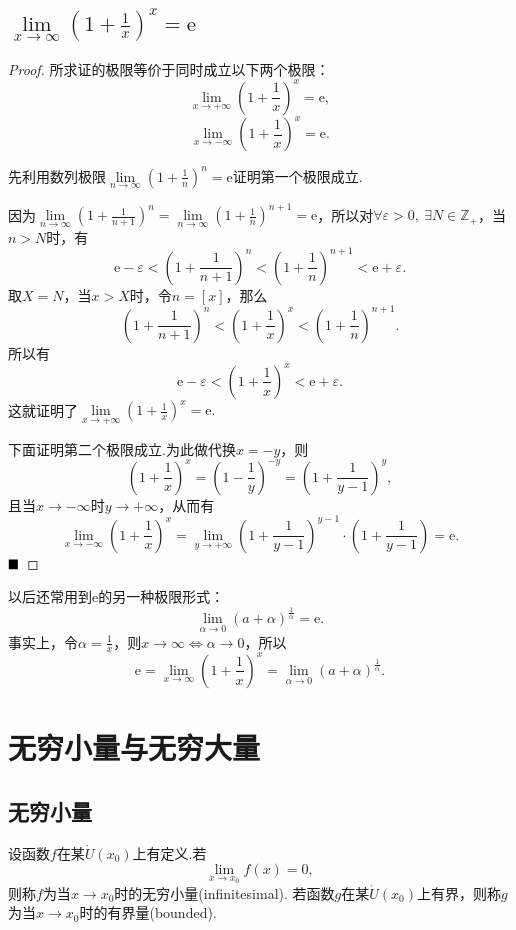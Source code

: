 \subsection{$\lim\limits_{x\to\infty}(1+\frac{1}{x})^x=\text{e}$}
\begin{proof}
	所求证的极限等价于同时成立以下两个极限：
	$$\lim\limits_{x\to +\infty}(1+\frac{1}{x})^x=\text{e},$$
	$$\lim\limits_{x\to -\infty}(1+\frac{1}{x})^x=\text{e}.$$
	
	先利用数列极限$\lim\limits_{n\to \infty}(1+\frac{1}{n})^n=\text{e}$证明第一个极限成立.
	
	因为$\lim\limits_{n\to \infty}(1+\frac{1}{n+1})^n=\lim\limits_{n\to \infty}(1+\frac{1}{n})^{n+1}=\text{e}$，所以对$\forall\varepsilon>0,\ \exists N\in \mathbb{Z}_+$，当$n>N$时，有
	$$\text{e}-\varepsilon<(1+\frac{1}{n+1})^n<(1+\frac{1}{n})^{n+1}<\text{e}+\varepsilon.$$
	取$X=N$，当$x>X$时，令$n=\left[x\right]$，那么
	$$(1+\frac{1}{n+1})^n<(1+\frac{1}{x})^x<(1+\frac{1}{n})^{n+1}.$$
	所以有
	$$\text{e}-\varepsilon<(1+\frac{1}{x})^x<\text{e}+\varepsilon.$$
	这就证明了$\lim\limits_{x\to +\infty}(1+\frac{1}{x})^x=\text{e}.$
	
	\hspace*{\fill}
	
	下面证明第二个极限成立.为此做代换$x=-y$，则
	$$(1+\frac{1}{x})^x=(1-\frac{1}{y})^{-y}=(1+\frac{1}{y-1})^y,$$
	且当$x\to -\infty$时$y\to +\infty$，从而有
	$$\lim\limits_{x\to -\infty}(1+\frac{1}{x})^x=\lim\limits_{y\to +\infty}(1+\frac{1}{y-1})^{y-1}\cdot (1+\frac{1}{y-1})=\text{e}.$$
	$\hfill\blacksquare$
\end{proof}
\begin{remark}
	以后还常用到e的另一种极限形式：
	$$\lim\limits_{\alpha\to 0}(a+\alpha)^{\frac{1}{\alpha}}=\text{e}.$$
	事实上，令$\alpha=\frac{1}{x}$，则$x\to\infty\iff\alpha\to 0$，所以
	$$\text{e}=\lim\limits_{x\to\infty}(1+\frac{1}{x})^x=\lim\limits_{\alpha\to 0}(a+\alpha)^{\frac{1}{\alpha}}.$$
\end{remark}
\section{无穷小量与无穷大量}
\subsection{无穷小量}
\begin{definition}
	设函数$f$在某$\mathring{U}(x_0)$上有定义.若
	$$\lim\limits_{x\to x_0}f(x)=0,$$
	则称$f$为当$x\to x_0$时的{\heiti 无穷小量}(infinitesimal).
	若函数$g$在某$\mathring{U}(x_0)$上有界，则称$g$为当$x\to x_0$时的{\heiti 有界量}(bounded).
\end{definition}

